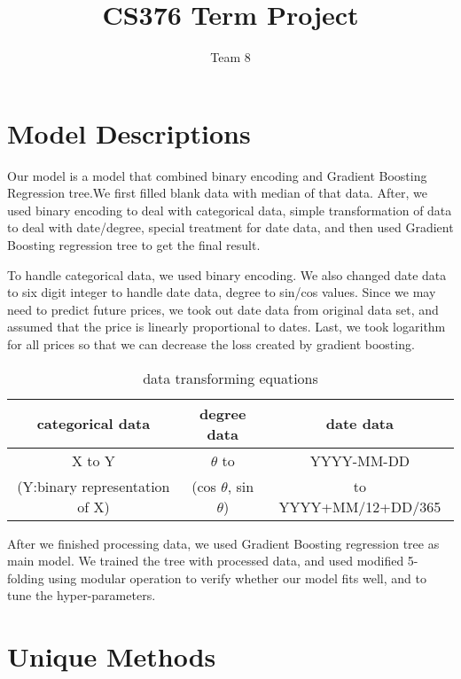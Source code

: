 \documentclass{article}
\title{CS376 Term Project}
\author{Team 8}
\begin{document}
\maketitle

\section{Model Descriptions}
Our model is a model that combined binary encoding and Gradient Boosting Regression tree.We first filled blank data with median of that data. After, we used binary encoding to deal with categorical data, simple transformation of data to deal with date/degree, special treatment for date data, and then used Gradient Boosting regression tree to get the final result.\par
To handle categorical data, we used binary encoding. We also changed date data to six digit integer to handle date data, degree to sin/cos values. Since we may need to predict future prices, we took out date data from original data set, and assumed that the price is linearly proportional to dates. Last, we took logarithm for all prices so that we can decrease the loss created by gradient boosting.\par
\begin{table} [ht]
\begin{center}
\caption{data transforming equations}
\begin{tabular} {c |c| c}
  \textbf{categorical data} & \textbf{degree data} & \textbf{date data}\\
\hline
X to Y &  $\theta$ to  & YYYY-MM-DD\\
(Y:binary representation of X) & (cos $\theta$, sin $\theta$) & to YYYY+MM/12+DD/365\\
\end{tabular}
\end{center}
\end{table}
After we finished processing data, we used Gradient Boosting regression tree as main model. We trained the tree with processed data, and used modified 5-folding using modular operation to verify whether our model fits well, and to tune the hyper-parameters.

\section{Unique Methods}
\end{document}
